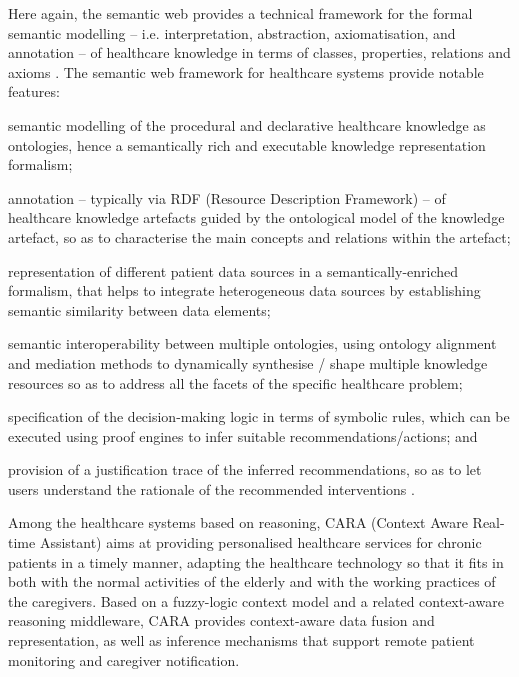 \documentclass[12pt,a4paper,openright,twoside]{book}
\begin{document}
Here again, the semantic web provides a technical framework for the formal semantic modelling -- i.e. interpretation, abstraction, axiomatisation, and annotation -- of healthcare knowledge in terms of classes, properties, relations and axioms \cite{berners2001semantic}.
%
The semantic web framework for healthcare systems provide notable features:
%
\begin{inlinelist}
    \item semantic modelling of the procedural and declarative healthcare knowledge as ontologies, hence a semantically rich and executable knowledge representation formalism;
    \item annotation -- typically via RDF (Resource Description Framework) -- of healthcare knowledge artefacts guided by the ontological model of the knowledge artefact, so as to characterise the main concepts and relations within the artefact;
    \item representation of different patient data sources in a semantically-enriched formalism, that helps to integrate heterogeneous data sources by establishing semantic similarity between data elements;
    \item semantic interoperability between multiple ontologies, using ontology alignment and mediation methods to dynamically synthesise / shape multiple knowledge resources so as to address all the facets of the specific healthcare problem;
    \item specification of the decision-making logic in terms of symbolic rules, which can be executed using proof engines to infer suitable recommendations/actions;
and
    \item provision of a justification trace of the inferred recommendations, so as to let users understand the rationale of the recommended interventions \cite{Abidi2008}.
\end{inlinelist}

Among the healthcare systems based on reasoning, CARA (Context Aware Real-time Assistant) \cite{yuan2012} aims at providing personalised healthcare services for chronic patients in a timely manner, adapting the healthcare technology so that it fits in both with the normal activities of the elderly and with the working practices of the caregivers.
%
Based on a fuzzy-logic context model and a related context-aware reasoning middleware, CARA provides context-aware data fusion and representation, as well as inference mechanisms that support remote patient monitoring and caregiver notification.
\end{document}
